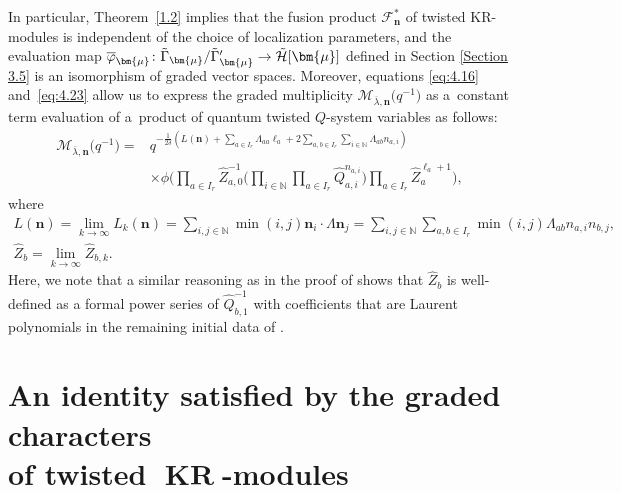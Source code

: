 \documentclass[pdftex]{sigma}
\numberwithin{equation}{section}
\DeclareMathOperator{\KR}{KR}
\begin{document}
In particular, Theorem~\ref{1.2} implies that the fusion product $\mathcal{F}_{\mathbf{n}}^*$ of twisted KR-modules is independent of the choice of localization parameters, and the evaluation map $\smash{\overline{\varphi}_{ \bm{\mu}}\colon \tilde{\Gamma}_{\bm{ \mu}}/\tilde{\Gamma}_{\bm{\mu}}' }\to\tilde{\mathcal{H}}[\bm{\mu}]$ defined in Section \ref{Section 3.5} is an isomorphism of graded vector spaces. Moreover, equations \eqref{eq:4.16} and~\eqref{eq:4.23} allow us to express the graded multiplicity $\mathcal{M}_{\overline{\lambda},\mathbf{n}}\bigl(q^{-1}\bigr)$ as a~constant term evaluation of a~product of quantum twisted $Q$-system variables as follows:
\begin{align}
\mathcal{M}_{\overline{\lambda},\mathbf{n}}\bigl(q^{-1}\bigr)
={}&q^{-\frac{1}{2\delta}(L(\mathbf{n})+\sum_{a\in I_r}\Lambda_{aa}\ell_a+2\sum_{a,b\in I_r}\sum_{i\in\mathbb{N}}\Lambda_{ab}n_{a,i})}\nonumber\\
&\times\phi\biggl(\prod_{a\in I_r}\widehat{Z}_{a,0}^{-1}\biggl(\prod_{i\in\mathbb{N}}\prod_{a\in I_r}\widehat{Q}_{a,i} ^{n_{a,i}}\biggr)\prod_{a\in I_r}\widehat{Z}_a^{\ell_a+1}\biggr),\label{eq:4.29}
\end{align}
where
\begin{gather*}
L(\mathbf{n})
=\lim_{k\to\infty}L_k(\mathbf{n})
=\sum_{i,j\in\mathbb{N}}\min(i,j)\mathbf{n}_i\cdot\Lambda\mathbf{n}_j
=\sum_{i,j\in\mathbb{N}}\sum_{a,b\in I_r}\min(i,j)\Lambda_{ab} n_{a,i}n_{b,j},\\
\widehat{Z}_b
=\lim_{k\to\infty}\widehat{Z}_{b,k}.
\end{gather*}
Here, we note that a similar reasoning as in the proof of \cite[Theorem 5.17]{DFK14} shows that $\widehat{Z}_b$ is well-defined as a formal power series of $\widehat{Q}_{b,1}^{-1}$ with coefficients that are Laurent polynomials in the remaining initial data of .

\section[An identity satisfied by the graded characters of twisted KR-modules]{An identity satisfied by the graded characters\\ of twisted $\boldsymbol{ \KR}$-modules}\label{Section 5}
\end{document}
